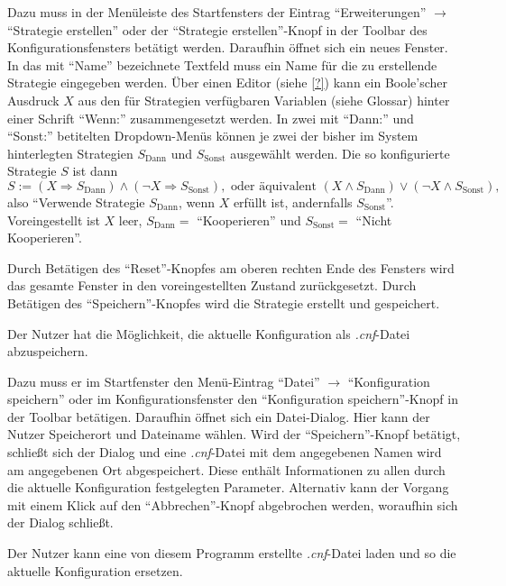 \documentclass[parskip=full,11pt]{scrartcl}
\begin{document}
Dazu muss in der Menüleiste des Startfensters der Eintrag \enquote{Erweiterungen} \(\rightarrow\) \enquote{Strategie erstellen} oder der \enquote{Strategie erstellen}-Knopf in der Toolbar des Konfigurationsfensters betätigt werden. Daraufhin öffnet sich ein neues Fenster. In das mit \enquote{Name} bezeichnete Textfeld muss ein Name für die zu erstellende Strategie eingegeben werden. Über einen Editor (siehe \cref{?}) kann ein Boole'scher Ausdruck \(X\) aus den für Strategien verfügbaren Variablen (siehe Glossar) hinter einer Schrift \enquote{Wenn:} zusammengesetzt werden. In zwei mit \enquote{Dann:} und \enquote{Sonst:} betitelten Dropdown-Menüs können je zwei der bisher im System hinterlegten Strategien \(S_\text{Dann}\) und \(S_\text{Sonst}\) ausgewählt werden. Die so konfigurierte Strategie \(S\) ist dann
\[
S := (X \Rightarrow S_\text{Dann}) \land (\lnot X \Rightarrow S_\text{Sonst}), \text{ oder äquivalent } (X \land S_\text{Dann}) \lor (\lnot X \land S_\text{Sonst}),
\]
also \enquote{Verwende Strategie \(S_\text{Dann}\), wenn \(X\) erfüllt ist, andernfalls \(S_\text{Sonst}\)}. Voreingestellt ist \(X\) leer, \(S_\text{Dann} =\) \enquote{Kooperieren} und \(S_\text{Sonst} =\) \enquote{Nicht Kooperieren}.

Durch Betätigen des \enquote{Reset}-Knopfes am oberen rechten Ende des Fensters wird das gesamte Fenster in den voreingestellten Zustand zurückgesetzt. Durch Betätigen des \enquote{Speichern}-Knopfes wird die Strategie erstellt und gespeichert.

Der Nutzer hat die Möglichkeit, die aktuelle Konfiguration als \textit{.cnf}-Datei abzuspeichern.

Dazu muss er im Startfenster den Menü-Eintrag \enquote{Datei} \(\rightarrow\) \enquote{Konfiguration speichern} oder im Konfigurationsfenster den \enquote{Konfiguration speichern}-Knopf in der Toolbar betätigen. Daraufhin öffnet sich ein Datei-Dialog. Hier kann der Nutzer Speicherort und Dateiname wählen. Wird der \enquote{Speichern}-Knopf betätigt, schließt sich der Dialog und eine \textit{.cnf}-Datei mit dem angegebenen Namen wird am angegebenen Ort abgespeichert. Diese enthält Informationen zu allen durch die aktuelle Konfiguration festgelegten Parameter. Alternativ kann der Vorgang mit einem Klick auf den \enquote{Abbrechen}-Knopf abgebrochen werden, woraufhin sich der Dialog schließt.

Der Nutzer kann eine von diesem Programm erstellte \textit{.cnf}-Datei laden und so die aktuelle Konfiguration ersetzen.
\end{document}
